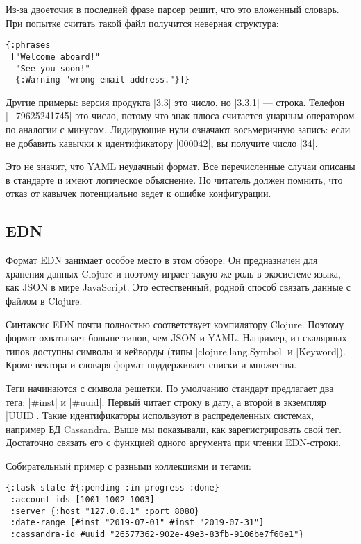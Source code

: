 Из-за двоеточия в последней фразе парсер решит, что это вложенный словарь. При
попытке считать такой файл получится неверная структура:

\begin{verbatim}
{:phrases
 ["Welcome aboard!"
  "See you soon!"
  {:Warning "wrong email address."}]}
\end{verbatim}

Другие примеры: версия продукта \spverb|3.3| это число, но \spverb|3.3.1| — строка. Телефон
\spverb|+79625241745| это число, потому что знак плюса считается унарным оператором по
аналогии с минусом. Лидирующие нули означают восьмеричную запись: если не
добавить кавычки к идентификатору \spverb|000042|, вы получите число \spverb|34|.

Это не значит, что YAML неудачный формат. Все перечисленные случаи описаны в
стандарте и имеют логическое объяснение. Но читатель должен помнить, что отказ
от кавычек потенциально ведет к ошибке конфигурации.

\subsection{EDN}

Формат EDN занимает особое место в этом обзоре. Он предназначен для хранения
данных Clojure и поэтому играет такую же роль в экосистеме языка, как JSON в
мире JavaScript. Это естественный, родной способ связать данные с файлом в
Clojure.

Синтаксис EDN почти полностью соответствует компилятору Clojure. Поэтому формат
охватывает больше типов, чем JSON и YAML. Например, из скалярных типов доступны
символы и кейворды (типы \spverb|clojure.lang.Symbol| и \spverb|Keyword|). Кроме вектора и
словаря формат поддерживает списки и множества.

Теги начинаются с символа решетки. По умолчанию стандарт предлагает два тега:
\spverb|#inst| и \spverb|#uuid|. Первый читает строку в дату, а второй в экземпляр
\spverb|UUID|. Такие идентификаторы используют в распределенных системах, например БД
Cassandra. Выше мы показывали, как зарегистрировать свой тег. Достаточно связать
его с функцией одного аргумента при чтении EDN-строки.

Собирательный пример с разными коллекциями и тегами:

\begin{verbatim}
{:task-state #{:pending :in-progress :done}
 :account-ids [1001 1002 1003]
 :server {:host "127.0.0.1" :port 8080}
 :date-range [#inst "2019-07-01" #inst "2019-07-31"]
 :cassandra-id #uuid "26577362-902e-49e3-83fb-9106be7f60e1"}
\end{verbatim}

